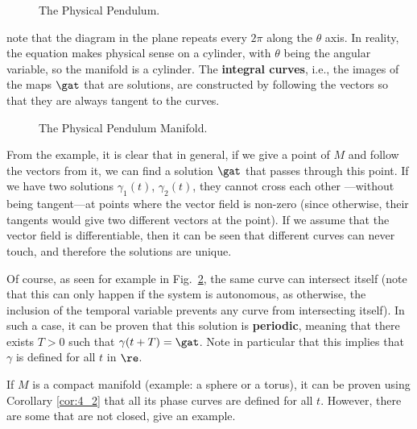 \begin{figure}[htbp]
  \begin{center}
    \caption{The Physical Pendulum.}
    \label{fig:4_6}
  \end{center}
\end{figure}

\noi
note that the diagram in the plane repeats every $2\pi$ along the $\theta$ axis.
In reality, the equation makes physical sense on a
cylinder, with $\theta$ being the angular variable, 
so the manifold is a cylinder. 
The {\bf integral curves}, i.e., the images of the maps $\gat$ that are
solutions,
are constructed by following the vectors so that they are
always tangent to the curves.


\begin{figure}[htbp]
  \begin{center}
    \caption{The Physical Pendulum Manifold.}
    \label{fig:4_7}
  \end{center}
\end{figure}

From the example, it is clear that in general, if we give a point of $M$
and follow the vectors from it, we can find 
a solution $\gat$ that passes through this point. 
If we have two solutions $\gamma_1(t)$,
$\gamma_2(t)$, they cannot cross each other ---without being tangent---at
points where the vector field is non-zero (since
otherwise, their tangents would give two different vectors at the point).
If we assume that the vector field is differentiable, then it can be
seen that different curves can never touch, and therefore the
solutions are unique.

Of course, as seen for example in Fig.~\ref{fig:4_7}, 
the same curve can intersect itself (note that this can only happen
if the system is autonomous, as otherwise, the inclusion of
the temporal variable prevents any curve from intersecting itself). 
In such a case, it can be proven that this solution is
{\bf periodic}, meaning that there exists $T>0$ such that $\gamma(t+T)=\gat$. Note
in particular that this implies that $\gamma$ is defined for all
$t$ in $\re$.

\espa \noi
\bpro If $M$ is a compact manifold (example: a sphere
or a torus), it can be proven using Corollary \ref{cor:4_2} that all 
its phase curves are defined for all $t$. 
However, there are some that are not
closed, give an example.
\epro

